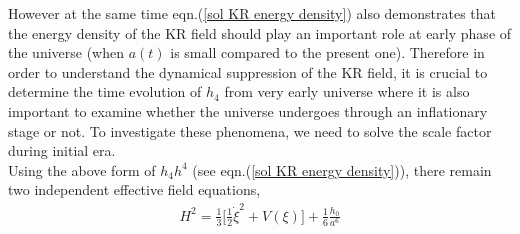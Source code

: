 \documentclass[a4paper]{article}
\begin{document}
However at the same time eqn.(\ref{sol KR energy density}) 
also demonstrates that the energy density of the KR field should play an important role at early phase of the universe (when $a(t)$ is small 
compared to the present one). Therefore in order to understand the dynamical suppression of the KR field, 
it is crucial to determine the time evolution of $h_4$ from very early universe where it is also important to examine 
whether the universe undergoes through an inflationary stage or not. To investigate these phenomena, 
we need to solve the scale factor during initial era.\\
Using the above form of $h_4h^4$ (see eqn.(\ref{sol KR energy density})), 
there remain two independent effective field equations,
\begin{eqnarray}
 H^2 = \frac{1}{3}\bigg[\frac{1}{2}\dot{\xi}^2 + V(\xi)\bigg] + \frac{1}{6}\frac{h_0}{a^6}
 \label{independent equation1}
\end{eqnarray}
\end{document}
